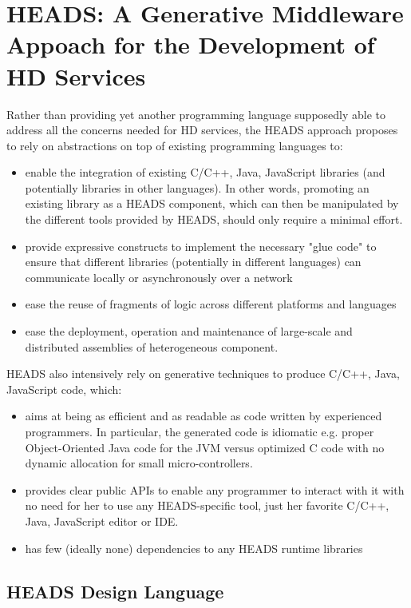 \section{HEADS: A Generative Middleware Appoach for the Development of HD Services}

Rather than providing yet another programming language supposedly able to address all the concerns needed for HD services, the HEADS approach proposes to rely on abstractions on top of existing programming languages to: 
\begin{itemize}
\item enable the integration of existing C/C++, Java, JavaScript libraries (and potentially libraries in other languages). In other words, promoting an existing library as a HEADS component, which can then be manipulated by the different tools provided by HEADS, should only require a minimal effort. 
\item provide expressive constructs to implement the necessary "glue code" to ensure that different libraries (potentially in different languages) can communicate locally or asynchronously over a network 
\item ease the reuse of fragments of logic across different platforms and languages 
\item ease the deployment, operation and maintenance of large-scale and distributed assemblies of heterogeneous component.
\end{itemize}

HEADS also intensively rely on generative techniques to produce C/C++, Java, JavaScript code, which: 
\begin{itemize}
	\item aims at being as efficient and as readable as code written by experienced programmers. In particular, the generated code is idiomatic e.g. proper Object-Oriented Java code for the JVM versus optimized C code with no dynamic allocation for small micro-controllers. 
\item provides clear public APIs to enable any programmer to interact with it with no need for her to use any HEADS-specific tool, just her favorite C/C++, Java, JavaScript editor or IDE. 
\item has few (ideally none) dependencies to any HEADS runtime libraries
\end{itemize}

\subsection{HEADS Design Language}

